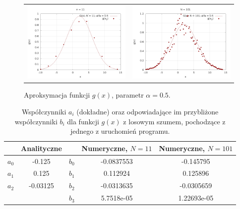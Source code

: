 \begin{figure}[h!]
	\begin{tabular}{cc}
		\includegraphics[width=81mm]{n11_2.png} &   \includegraphics[width=81mm]{n101.png}
	\end{tabular}
	\caption{Aproksymacja funkcji $ g(x) $, parametr $ \alpha = 0.5 $.}
	\label{drugi} 
\end{figure}

\begin{table}[h!]
	\centering
	\begin{tabular}{|c|c|c|c|c|}
		\hline
		& Analityczne & & Numeryczne, $ N = 11 $ & Numeryczne, $ N = 101 $\\
		\hline
		$ a_0 $ & -0.125 & $ b_0 $& -0.0837553 & -0.145795\\
		$ a_1 $ & 0.125 & $ b_1 $&0.112924& 0.125896\\
		$ a_2 $ & -0.03125 & $ b_2 $&-0.0313635& -0.0305659\\
		&  & $ b_3 $&5.7518e-05 & 1.22693e-05\\
		\hline
	\end{tabular}
	\caption{Współczynniki $ a_i $ (dokładne) oraz odpowiadające im przybliżone współczynniki $ b_i $ dla funkcji $ g(x) $ z losowym szumem, pochodzące z jednego z uruchomień programu.}
\end{table}

